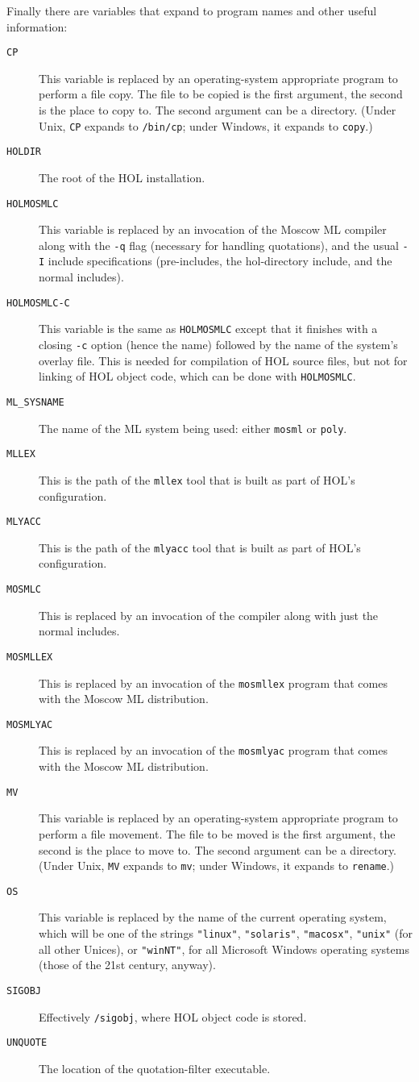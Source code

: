 Finally there are variables that expand to program names and other
useful information:
\begin{description}
\item[\texttt{CP}] This variable is replaced by an operating-system
  appropriate program to perform a file copy.  The file to be copied
  is the first argument, the second is the place to copy to.  The
  second argument can be a directory.  (Under Unix, \texttt{CP}
  expands to \texttt{/bin/cp}; under Windows, it expands to
  \texttt{copy}.)
\item[\texttt{HOLDIR}] The root of the HOL installation.
\item[\texttt{HOLMOSMLC}] This variable is replaced by an invocation
  of the Moscow ML compiler along with the \texttt{-q} flag (necessary
  for handling quotations), and the usual \texttt{-I} include
  specifications (pre-includes, the hol-directory include, and the
  normal includes).
\item[\texttt{HOLMOSMLC-C}] This variable is the same as
  \texttt{HOLMOSMLC} except that it finishes with a closing
  \texttt{-c} option (hence the name) followed by the name of the
  system's overlay file.  This is needed for compilation of HOL source
  files, but not for linking of HOL object code, which can be done
  with \texttt{HOLMOSMLC}.
\item[\texttt{ML\_SYSNAME}] The name of the ML system being used:
  either \texttt{mosml} or \texttt{poly}.
\item[\texttt{MLLEX}] This is the path of the \texttt{mllex} tool that
  is built as part of HOL's configuration.
\item[\texttt{MLYACC}] This is the path of the \texttt{mlyacc} tool that
  is built as part of HOL's configuration.
\item[\texttt{MOSMLC}] This is replaced by an invocation of the
  compiler along with just the normal includes.
\item[\texttt{MOSMLLEX}] This is replaced by an invocation of the
  \texttt{mosmllex} program that comes with the Moscow ML
  distribution.
\item[\texttt{MOSMLYAC}] This is replaced by an invocation of the
  \texttt{mosmlyac} program that comes with the Moscow ML
  distribution.
\item[\texttt{MV}] This variable is replaced by an operating-system
  appropriate program to perform a file movement.  The file to be
  moved is the first argument, the second is the place to move to.
  The second argument can be a directory.  (Under Unix, \texttt{MV}
  expands to \texttt{mv}; under Windows, it expands to \texttt{rename}.)
\item[\texttt{OS}] This variable is replaced by the name of the
  current operating system, which will be one of the strings
  \texttt{"linux"}, \texttt{"solaris"}, \texttt{"macosx"},
  \texttt{"unix"} (for all other Unices), or \texttt{"winNT"}, for all
  Microsoft Windows operating systems (those of the 21st century,
  anyway).
\item[\texttt{SIGOBJ}] Effectively \texttt{/sigobj},
  where HOL object code is stored.
  \item[\texttt{UNQUOTE}] The location of the quotation-filter executable.
\end{description}
